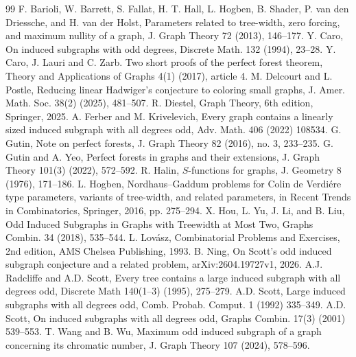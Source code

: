\documentclass{article}
\newcommand{\2}{\vspace{0.2cm}}
\begin{document}
\begin{thebibliography}{99}
 F. Barioli, W. Barrett, S. Fallat, H. T. Hall, L. Hogben, B. Shader, P. van den Driessche, and H. van der Holst, Parameters related to tree-width, zero forcing, and maximum nullity of a graph, J. Graph Theory 72 (2013), 146--177.
 Y. Caro, On induced subgraphs with odd degrees, Discrete Math. 132 (1994), 23--28.
 Y. Caro, J. Lauri and C. Zarb. Two short proofs of the perfect forest
theorem, Theory and Applications of Graphs 4(1) (2017), article 4.
 M. Delcourt and L. Postle, Reducing linear Hadwiger's conjecture to coloring small graphs, J. Amer. Math. Soc. 38(2) (2025), 481--507.
 R. Diestel, Graph Theory, 6th edition, Springer, 2025.
 A. Ferber and M. Krivelevich, Every graph contains a linearly sized induced subgraph with all degrees odd, Adv. Math. 406 (2022) 108534.
 G. Gutin, Note on perfect forests, J. Graph Theory 82 (2016), no. 3, 233--235.
 G. Gutin and A. Yeo, Perfect forests in graphs and their extensions, J. Graph Theory 101(3) (2022), 572--592. 
 R. Halin, $S$-functions for graphs, J. Geometry 8 (1976), 171--186.
 L. Hogben, Nordhaus–Gaddum problems for Colin de Verdi{\'e}re type parameters, variants of tree-width, and related parameters, 
in Recent Trends in Combinatorics, Springer, 2016, pp. 275--294.
 X. Hou, L. Yu, J. Li, and B. Liu, Odd Induced Subgraphs in Graphs with Treewidth at Most Two, Graphs Combin. 34 (2018), 535--544.
 L. Lov\'asz, Combinatorial Problems and Exercises, 2nd edition, AMS Chelsea Publishing, 1993.
 B. Ning, On Scott’s odd induced subgraph conjecture and a related problem, arXiv:2604.19727v1, 2026.
 A.J. Radcliffe and A.D. Scott, Every tree contains a large induced subgraph with all degrees odd, Discrete Math 140(1--3) (1995),  275--279.
 A.D. Scott, Large induced subgraphs with all degrees odd, Comb. Probab. Comput. 1 (1992) 335--349.
  A.D. Scott, On induced subgraphs with all degrees odd, Graphs Combin.
17(3) (2001) 539--553.
 T. Wang and B. Wu, Maximum odd induced subgraph of a graph concerning its chromatic number, J. Graph Theory 107 (2024), 
578--596.
\end{thebibliography}
\end{document}
